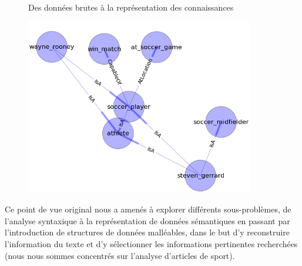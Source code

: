 \documentclass[a4paper,12pt]{article}
\begin{document}
\begin{figure}[ht]
\begin{center}
  \quad
  \\
\end{center}
\caption{Des données brutes à la représentation des connaissances}
\label{fig:inf}
\end{figure}

\begin{figure}[!h]
  \centering 
  \includegraphics[width=10cm]{./figure_1.png}
\end{figure}


Ce point de vue original nous a amenés à explorer différents sous-problèmes, de l'analyse syntaxique à la représentation de données sémantiques en passant par l'introduction de structures de données malléables, dans le but d'y reconstruire l'information du texte et d'y sélectionner les informations pertinentes recherchées (nous nous sommes concentrés sur l'analyse d'articles de sport).
\end{document}
